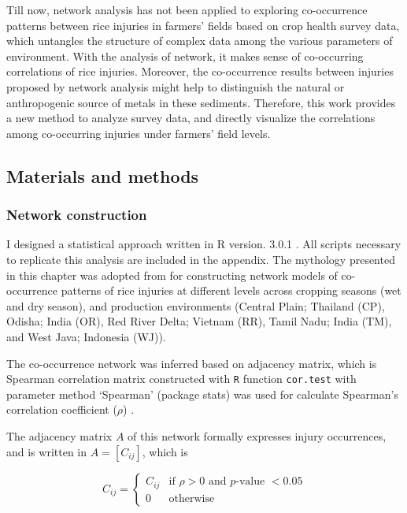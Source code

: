 Till now, network analysis has not been applied to exploring co-occurrence patterns between rice injuries in farmers’ fields based on crop health survey data, which untangles the structure of complex data among the various parameters of environment. With the analysis of network, it makes sense of co-occurring correlations of rice injuries. Moreover, the co-occurrence results between injuries proposed by network analysis might help to distinguish the natural or anthropogenic source of metals in these sediments. Therefore, this work provides a new method to analyze survey data, and directly visualize the correlations among co-occurring injuries under farmers’ field levels.

\subsection{Materials and methods} 

\subsubsection{Network construction}
I designed a statistical approach written in R version. 3.0.1 \citep{R_2015}. All scripts necessary to replicate this analysis are included in the appendix. The mythology presented in this chapter was adopted from \citet{Williams_2014_demonstrating} for constructing network models of co-occurrence patterns of rice injuries at different levels across cropping seasons (wet and dry season), and production environments (Central Plain; Thailand (CP), Odisha; India (OR), Red River Delta; Vietnam (RR), Tamil Nadu; India (TM), and West Java; Indonesia (WJ)). 

The co-occurrence network was inferred based on adjacency matrix, which is Spearman correlation matrix constructed with \texttt{R} function \texttt{cor.test} with parameter method `Spearman' (package stats) was used for calculate Spearman's correlation coefficient ($\rho$) \citep{R_2015}.

The adjacency matrix $A$ of this network formally expresses injury occurrences, and is written in $A=[C_{ij}]$, which is

\begin{equation}
C_{ij} = \begin{cases}
C_{ij} & \text{if } \rho > 0  \text{ and }  p\text{-value } < 0.05 \\ 
0 & \text{otherwise}
\end{cases}
\end{equation}

